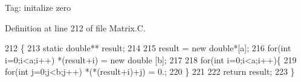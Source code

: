 Tag\+: initalize zero 

Definition at line 212 of file Matrix.\+C.


\begin{DoxyCode}
212                            \{
213     \textcolor{keyword}{static} \textcolor{keywordtype}{double}** result;
214     
215     result = \textcolor{keyword}{new} \textcolor{keywordtype}{double}*[a];
216     \textcolor{keywordflow}{for}(\textcolor{keywordtype}{int} i=0;i<a;i++) *(result+i) = \textcolor{keyword}{new} \textcolor{keywordtype}{double} [b];
217 
218     \textcolor{keywordflow}{for}(\textcolor{keywordtype}{int} i=0;i<a;i++)\{
219         \textcolor{keywordflow}{for}(\textcolor{keywordtype}{int} j=0;j<b;j++) *(*(result+i)+j) = 0.;
220     \}
221     
222     \textcolor{keywordflow}{return} result;
223 \}
\end{DoxyCode}
